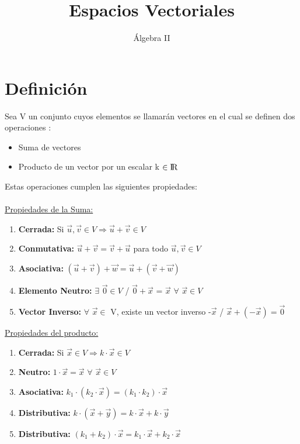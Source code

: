 \documentclass{article}
\title{Espacios Vectoriales}
\author{Álgebra II}
\date{\vspace{-5ex}}
\begin{document}
\maketitle{}
\section{Definición}
Sea V un conjunto cuyos elementos se llamarán vectores en
el cual se definen dos operaciones :

\begin{itemize}
\item Suma de vectores
\item Producto de un vector por un escalar k $\in {\rm I\!R}$\
\end{itemize}
Estas operaciones cumplen las siguientes propiedades:\\\\
\underline {Propiedades de la Suma:}
\begin{enumerate}
\item {\bfseries Cerrada:} Si $\vec{u}, \vec{v} \in V \Rightarrow \vec{u}+\vec{v} \in V$
\item {\bfseries Conmutativa:} $\vec{u} + \vec{v} = \vec{v} + \vec{u}$ para todo $\vec{u}, \vec{v} \in V $ 
\item {\bfseries Asociativa:} $(\vec{u}+\vec{v})+\vec{w} = \vec{u}+(\vec{v}+\vec{w})$
\item {\bfseries Elemento Neutro:} $\exists$ $\vec{0} \in V$ / $\vec{0} + \vec{x}$ = $\vec{x}$ $\forall$ $\vec{x}  \in V$
\item {\bfseries Vector Inverso:} $\forall$ $\vec{x} \in$ V, existe un vector inverso -$\vec{x}$ / $\vec{x}+(-\vec{x})=\vec{0}$
\end{enumerate}
\underline{Propiedades del producto:}
\begin{enumerate}
\item {\bfseries Cerrada:} Si $\vec{x} \in V \Rightarrow k\cdot\vec{x} \in V$
\item {\bfseries Neutro:} $1\cdot\vec{x} = \vec{x}$ $\forall$ $\vec{x} \in V $ 
\item {\bfseries Asociativa:} $k_{1}\cdot(k_{2} \cdot \vec{x} ) = (k_{1} \cdot k_{2})\cdot\vec{x}$
\item {\bfseries Distributiva:} $k  \cdot (\vec{x} + \vec{y}) = k \cdot \vec{x} + k \cdot \vec{y} $
\item {\bfseries Distributiva:} $(k_{1} + k_{2})\cdot \vec{x} = k_{1}\cdot\vec{x} + k_{2}\cdot\vec{x}$
\end{enumerate}
\newpage
\end{document}
